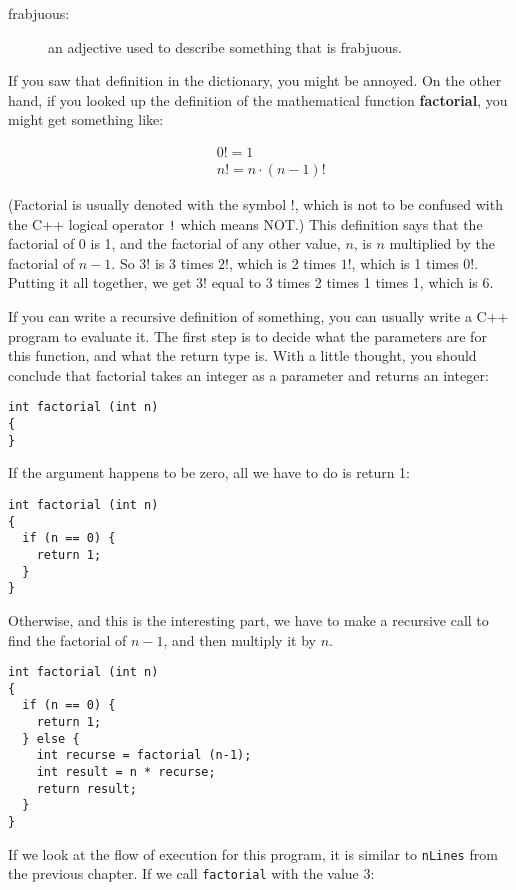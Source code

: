 \begin{description}

\item[frabjuous:] an adjective used to describe
something that is frabjuous.


\end{description}

If you saw that definition in the dictionary, you might be
annoyed.  On the other hand, if you looked up the definition
of the mathematical function {\bf factorial}, you might
get something like:

\begin{eqnarray*}
&&  0! = 1 \\
&&  n! = n \cdot (n-1)!
\end{eqnarray*}

(Factorial is usually denoted with the symbol $!$, which is
not to be confused with the C++ logical operator {\tt !} which
means NOT.)  This definition says that the factorial of 0 is 1,
and the factorial of any other value, $n$, is $n$ multiplied
by the factorial of $n-1$.  So $3!$ is 3 times $2!$, which is 2 times
$1!$, which is 1 times 0!.  Putting it all together, we get
$3!$ equal to 3 times 2 times 1 times 1, which is 6.

If you can write a recursive definition of something, you can usually
write a C++ program to evaluate it.  The first step is to decide what
the parameters are for this function, and what the return type is.
With a little thought, you should conclude that factorial takes an
integer as a parameter and returns an integer:

\begin{verbatim}
int factorial (int n)
{
}
\end{verbatim}
%
If the argument happens to be zero, all we have to do is
return 1:

\begin{verbatim}
int factorial (int n)
{
  if (n == 0) {
    return 1;
  }
}
\end{verbatim}
%
Otherwise, and this is the interesting part, we have to make
a recursive call to find the factorial of $n-1$, and then
multiply it by $n$.

\begin{verbatim}
int factorial (int n)
{
  if (n == 0) {
    return 1;
  } else {
    int recurse = factorial (n-1);
    int result = n * recurse;
    return result;
  }
}
\end{verbatim}
%
If we look at the flow of execution for this program,
it is similar to {\tt nLines} from the previous chapter.
If we call {\tt factorial} with the value 3:

